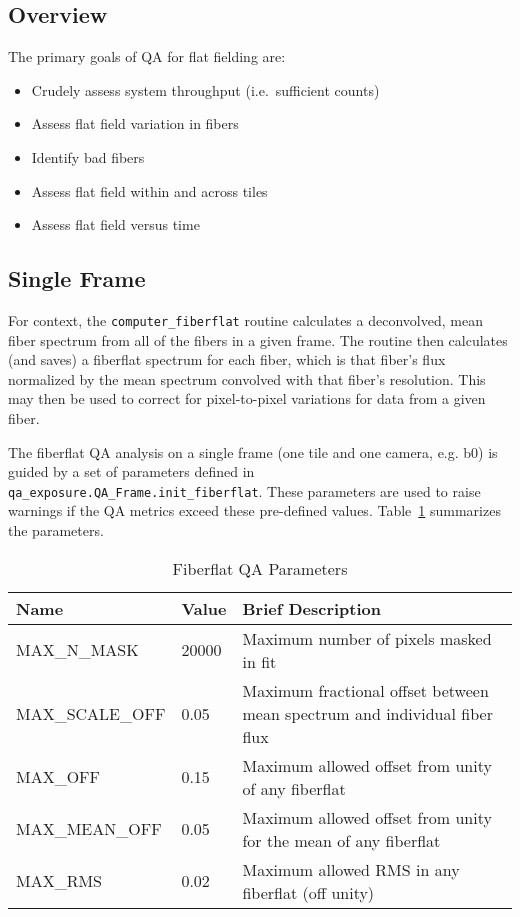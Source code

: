 \documentclass[12pt]{article}
\begin{document}
\subsection{Overview}

The primary goals of QA for flat fielding are:

\begin{itemize}
\item Crudely assess system throughput (i.e.\ sufficient counts)
\item Assess flat field variation in fibers
\item Identify bad fibers
\item Assess flat field within and across tiles
\item Assess flat field versus time
\end{itemize}

\subsection{Single Frame}

For context, the {\tt computer\_fiberflat} routine calculates a 
deconvolved, mean fiber spectrum from all of the fibers in a given frame. 
The routine then calculates (and saves) a fiberflat spectrum for each 
fiber, which is that fiber's flux normalized by the mean spectrum 
convolved with that fiber's resolution.  This may then be 
used to correct for pixel-to-pixel variations for data from 
a given fiber.

The fiberflat QA analysis on a single frame (one tile and one camera, e.g. b0)
is guided by a set of 
parameters defined in {\tt qa\_exposure.QA\_Frame.init\_fiberflat}.
These parameters are used 
to raise warnings if the QA metrics exceed these pre-defined values.
Table~\ref{tab:flat_param} summarizes the parameters.

\begin{table}[h]
\begin{center}
\caption{Fiberflat QA Parameters}
\label{tab:flat_param}
\begin{tabular}{p{3.5cm}p{1.2cm}p{8.3cm}}
\hline
{\bf Name} & {\bf Value} & {\bf Brief Description}\\
\hline
MAX\_N\_MASK    & 20000 & Maximum number of pixels masked in fit \\
MAX\_SCALE\_OFF & 0.05  & Maximum fractional offset between mean spectrum and individual fiber flux \\ 
MAX\_OFF        & 0.15  & Maximum allowed offset from unity of any fiberflat \\
MAX\_MEAN\_OFF  & 0.05  & Maximum allowed offset from unity for the mean of any fiberflat \\
MAX\_RMS        & 0.02  & Maximum allowed RMS in any fiberflat (off unity) \\
\hline
\end{tabular}
\end{center}
\end{table}
\end{document}
